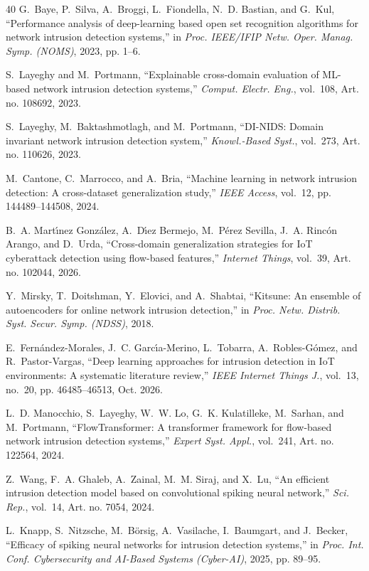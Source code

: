 \begin{thebibliography}{40}
G.~Baye, P.~Silva, A.~Broggi, L.~Fiondella, N.~D. Bastian, and G.~Kul, ``Performance analysis of deep-learning based open set recognition algorithms for network intrusion detection systems,'' in \emph{Proc. IEEE/IFIP Netw. Oper. Manag. Symp. (NOMS)}, 2023, pp. 1--6.

S.~Layeghy and M.~Portmann, ``Explainable cross-domain evaluation of ML-based network intrusion detection systems,'' \emph{Comput. Electr. Eng.}, vol.~108, Art. no. 108692, 2023.

S.~Layeghy, M.~Baktashmotlagh, and M.~Portmann, ``DI-NIDS: Domain invariant network intrusion detection system,'' \emph{Knowl.-Based Syst.}, vol.~273, Art. no. 110626, 2023.

M.~Cantone, C.~Marrocco, and A.~Bria, ``Machine learning in network intrusion detection: A cross-dataset generalization study,'' \emph{IEEE Access}, vol.~12, pp. 144489--144508, 2024.

B.~A. Mart\'{\i}nez Gonz\'{a}lez, A.~D\'{\i}ez Bermejo, M.~P\'{e}rez Sevilla, J.~A. Rinc\'{o}n Arango, and D.~Urda, ``Cross-domain generalization strategies for IoT cyberattack detection using flow-based features,'' \emph{Internet Things}, vol.~39, Art. no. 102044, 2026.

Y.~Mirsky, T.~Doitshman, Y.~Elovici, and A.~Shabtai, ``Kitsune: An ensemble of autoencoders for online network intrusion detection,'' in \emph{Proc. Netw. Distrib. Syst. Secur. Symp. (NDSS)}, 2018.

E.~Fern\'{a}ndez-Morales, J.~C. Garc\'{\i}a-Merino, L.~Tobarra, A.~Robles-G\'{o}mez, and R.~Pastor-Vargas, ``Deep learning approaches for intrusion detection in IoT environments: A systematic literature review,'' \emph{IEEE Internet Things J.}, vol.~13, no.~20, pp. 46485--46513, Oct. 2026.

L.~D. Manocchio, S.~Layeghy, W.~W. Lo, G.~K. Kulatilleke, M.~Sarhan, and M.~Portmann, ``FlowTransformer: A transformer framework for flow-based network intrusion detection systems,'' \emph{Expert Syst. Appl.}, vol.~241, Art. no. 122564, 2024.

Z.~Wang, F.~A. Ghaleb, A.~Zainal, M.~M. Siraj, and X.~Lu, ``An efficient intrusion detection model based on convolutional spiking neural network,'' \emph{Sci. Rep.}, vol.~14, Art. no. 7054, 2024.

L.~Knapp, S.~Nitzsche, M.~B\"{o}rsig, A.~Vasilache, I.~Baumgart, and J.~Becker, ``Efficacy of spiking neural networks for intrusion detection systems,'' in \emph{Proc. Int. Conf. Cybersecurity and AI-Based Systems (Cyber-AI)}, 2025, pp. 89--95.


\end{thebibliography}
